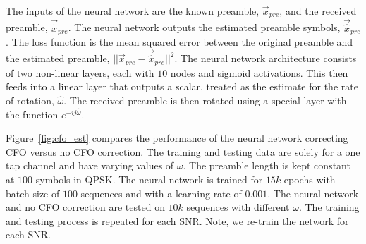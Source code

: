 The inputs of the neural network are the known preamble, $\vec{x}_{pre}$, and the received preamble, $\vec{\tilde{x}}_{pre}$.  The neural network outputs the estimated preamble symbols, $\vec{\hat{x}}_{pre}$.  
The loss function is the mean squared error between the original preamble and the estimated preamble, $||\vec{x}_{pre}-\vec{\hat{x}}_{pre}||^2$.
The neural network architecture consists of two non-linear layers, each with $10$ nodes and sigmoid activations.  This then feeds into a linear layer that outputs a scalar, treated as the estimate for the rate of rotation, $\hat{\omega}$. 
The received preamble is then rotated using a special layer with the function $e^{-ij\hat{\omega}}$.

Figure~\ref{fig:cfo_est} compares the performance of the neural network correcting CFO versus no CFO correction.  The training and testing data are solely for a one tap channel and have varying values of $\omega$. The preamble length is kept constant at $100$ symbols in QPSK.
The neural network is trained for $15k$ epochs with batch size of $100$ sequences and with a learning rate of $0.001$.  The neural network and no CFO correction are tested on $10k$ sequences with different $\omega$.  
The training and testing process is repeated for each SNR.  Note, we re-train the network for each SNR.  

